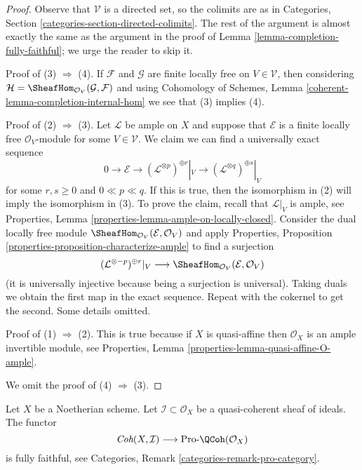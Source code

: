 \begin{proof}
Observe that $\mathcal{V}$ is a directed set, so the colimits are
as in Categories, Section \ref{categories-section-directed-colimits}.
The rest of the argument is almost exactly the same as the argument
in the proof of Lemma \ref{lemma-completion-fully-faithful}; we urge
the reader to skip it.

\medskip\noindent
Proof of (3) $\Rightarrow$ (4). If $\mathcal{F}$ and $\mathcal{G}$
are finite locally free on $V \in \mathcal{V}$, then considering
$\mathcal{H} = \SheafHom_{\mathcal{O}_V}(\mathcal{G}, \mathcal{F})$
and using Cohomology of Schemes, Lemma
\ref{coherent-lemma-completion-internal-hom}
we see that (3) implies (4).

\medskip\noindent
Proof of (2) $\Rightarrow$ (3). Let $\mathcal{L}$ be ample
on $X$ and suppose that $\mathcal{E}$ is a
finite locally free $\mathcal{O}_V$-module
for some $V \in \mathcal{V}$.
We claim we can find a universally exact sequence
$$
0 \to \mathcal{E} \to
(\mathcal{L}^{\otimes p})^{\oplus r}|_{V} \to
(\mathcal{L}^{\otimes q})^{\oplus s}|_{V}
$$
for some $r, s \geq 0$ and $0 \ll p \ll q$. If this is true, then
the isomorphism in (2) will imply the isomorphism in (3).
To prove the claim, recall that $\mathcal{L}|_V$ is ample, see
Properties, Lemma \ref{properties-lemma-ample-on-locally-closed}.
Consider the dual locally free module
$\SheafHom_{\mathcal{O}_V}(\mathcal{E}, \mathcal{O}_V)$
and apply
Properties, Proposition \ref{properties-proposition-characterize-ample}
to find a surjection
$$
(\mathcal{L}^{\otimes -p})^{\oplus r}|_V \longrightarrow
\SheafHom_{\mathcal{O}_V}(\mathcal{E}, \mathcal{O}_V)
$$
(it is universally injective because being a surjection is universal).
Taking duals we obtain the first map in the exact sequence.
Repeat with the cokernel to get the second. Some details omitted.

\medskip\noindent
Proof of (1) $\Rightarrow$ (2). This is true because if $X$ is quasi-affine
then $\mathcal{O}_X$ is an ample invertible module, see
Properties, Lemma \ref{properties-lemma-quasi-affine-O-ample}.

\medskip\noindent
We omit the proof of (4) $\Rightarrow$ (3).
\end{proof}

\begin{lemma}
\label{lemma-recognize-formal-coherent-modules}
Let $X$ be a Noetherian scheme. Let $\mathcal{I} \subset \mathcal{O}_X$
be a quasi-coherent sheaf of ideals. The functor
$$
\textit{Coh}(X, \mathcal{I}) \longrightarrow \text{Pro-}\QCoh(\mathcal{O}_X)
$$
is fully faithful, see Categories, Remark \ref{categories-remark-pro-category}.
\end{lemma}

